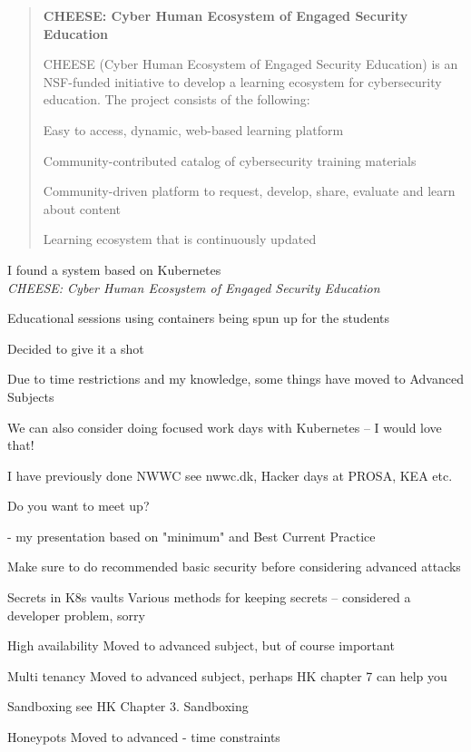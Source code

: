 \documentclass[Screen16to9,17pt]{foils}
\begin{document}

\begin{quote}
{\bf CHEESE: Cyber Human Ecosystem of Engaged Security Education}

CHEESE (Cyber Human Ecosystem of Engaged Security Education) is an NSF-funded initiative to develop a learning ecosystem for cybersecurity education. The project consists of the following:

\begin{list2}
\item Easy to access, dynamic, web-based learning platform
\item Community-contributed catalog of cybersecurity training materials
\item Community-driven platform to request, develop, share, evaluate and learn about content
\item Learning ecosystem that is continuously updated
\end{list2}
\end{quote}

\begin{list2}
\item I found a system based on Kubernetes \\
\emph{CHEESE: Cyber Human Ecosystem of Engaged Security Education}\\
\item Educational sessions using containers being spun up for the students
\item Decided to give it a shot
\end{list2}



Due to time restrictions and my knowledge, some things have moved to Advanced Subjects

We can also consider doing focused work days with Kubernetes -- I would love that!

I have previously done NWWC see nwwc.dk, Hacker days at PROSA, KEA etc.

Do you want to meet up?

- my presentation based on "minimum" and Best Current Practice

Make sure to do recommended basic security before considering advanced attacks



\begin{list2}
\item Secrets in K8s vaults Various methods for keeping secrets -- considered a developer problem, sorry
\item High availability Moved to advanced subject, but of course important
\item Multi tenancy Moved to advanced subject, perhaps HK chapter 7 can help you
\item Sandboxing see HK Chapter 3. Sandboxing
\item Honeypots Moved to advanced - time constraints
\end{list2}
\end{document}

